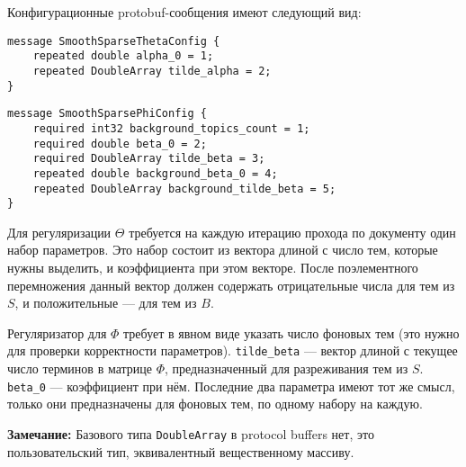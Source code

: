 Конфигурационные protobuf-сообщения имеют следующий вид:

\vspace{5pt}
\noindent\verb|message SmoothSparseThetaConfig {| \\
\verb|    repeated double alpha_0 = 1;| \\
\verb|    repeated DoubleArray tilde_alpha = 2;| \\
\verb|}|

\noindent\verb|message SmoothSparsePhiConfig {| \\
\verb|    required int32 background_topics_count = 1;| \\
\verb|    required double beta_0 = 2;| \\
\verb|    required DoubleArray tilde_beta = 3;| \\
\verb|    repeated double background_beta_0 = 4;| \\
\verb|    repeated DoubleArray background_tilde_beta = 5;| \\
\verb|}|

Для регуляризации $\Theta$ требуется на каждую итерацию прохода по документу один набор параметров. Это набор состоит из вектора длиной с число тем, которые нужны выделить, и коэффициента при этом векторе. После поэлементного перемножения данный вектор должен содержать отрицательные числа для тем из $S$, и положительные --- для тем из $B$.

Регуляризатор для $\Phi$ требует в явном виде указать число фоновых тем (это нужно для проверки корректности параметров). \verb'tilde_beta' --- вектор длиной с текущее число терминов в матрице $\Phi$, предназначенный для разреживания тем из $S$. \verb'beta_0' --- коэффициент при нём. Последние два параметра имеют тот же смысл, только они предназначены для фоновых тем, по одному набору на каждую.  

{\bf Замечание:} Базового типа \verb'DoubleArray' в protocol buffers нет, это пользовательский тип, эквивалентный вещественному массиву.
